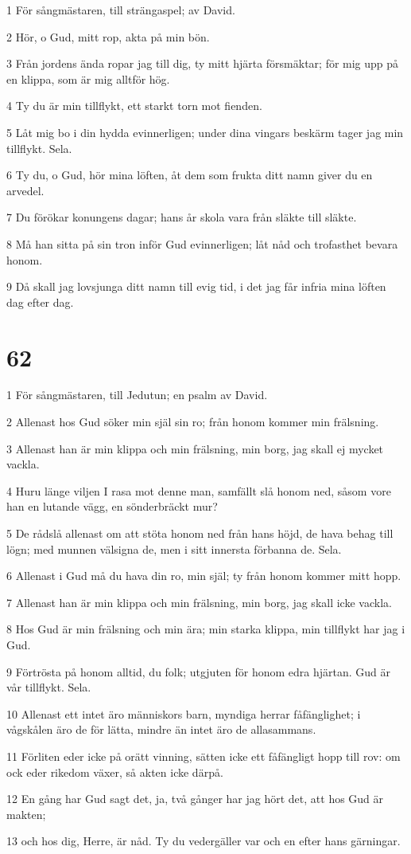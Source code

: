 \par 1 För sångmästaren, till strängaspel; av David.
\par 2 Hör, o Gud, mitt rop, akta på min bön.
\par 3 Från jordens ända ropar jag till dig, ty mitt hjärta försmäktar; för mig upp på en klippa, som är mig alltför hög.
\par 4 Ty du är min tillflykt, ett starkt torn mot fienden.
\par 5 Låt mig bo i din hydda evinnerligen; under dina vingars beskärm tager jag min tillflykt. Sela.
\par 6 Ty du, o Gud, hör mina löften, åt dem som frukta ditt namn giver du en arvedel.
\par 7 Du förökar konungens dagar; hans år skola vara från släkte till släkte.
\par 8 Må han sitta på sin tron inför Gud evinnerligen; låt nåd och trofasthet bevara honom.
\par 9 Då skall jag lovsjunga ditt namn till evig tid, i det jag får infria mina löften dag efter dag.

\chapter{62}

\par 1 För sångmästaren, till Jedutun; en psalm av David.
\par 2 Allenast hos Gud söker min själ sin ro; från honom kommer min frälsning.
\par 3 Allenast han är min klippa och min frälsning, min borg, jag skall ej mycket vackla.
\par 4 Huru länge viljen I rasa mot denne man, samfällt slå honom ned, såsom vore han en lutande vägg, en sönderbräckt mur?
\par 5 De rådslå allenast om att stöta honom ned från hans höjd, de hava behag till lögn; med munnen välsigna de, men i sitt innersta förbanna de. Sela.
\par 6 Allenast i Gud må du hava din ro, min själ; ty från honom kommer mitt hopp.
\par 7 Allenast han är min klippa och min frälsning, min borg, jag skall icke vackla.
\par 8 Hos Gud är min frälsning och min ära; min starka klippa, min tillflykt har jag i Gud.
\par 9 Förtrösta på honom alltid, du folk; utgjuten för honom edra hjärtan. Gud är vår tillflykt. Sela.
\par 10 Allenast ett intet äro människors barn, myndiga herrar fåfänglighet; i vågskålen äro de för lätta, mindre än intet äro de allasammans.
\par 11 Förliten eder icke på orätt vinning, sätten icke ett fåfängligt hopp till rov: om ock eder rikedom växer, så akten icke därpå.
\par 12 En gång har Gud sagt det, ja, två gånger har jag hört det, att hos Gud är makten;
\par 13 och hos dig, Herre, är nåd. Ty du vedergäller var och en efter hans gärningar.

